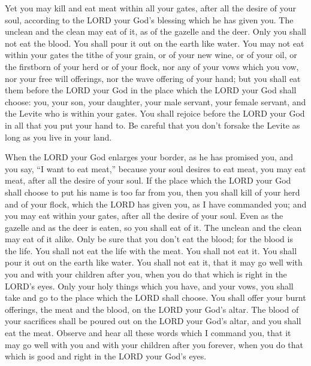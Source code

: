  Yet you may kill and eat meat within all your gates, after
all the desire of your soul, according to the LORD your God's blessing
which he has given you. The unclean and the clean may eat of it, as of
the gazelle and the deer.  Only you shall not eat the
blood. You shall pour it out on the earth like water.  You
may not eat within your gates the tithe of your grain, or of your new
wine, or of your oil, or the firstborn of your herd or of your flock,
nor any of your vows which you vow, nor your free will offerings, nor
the wave offering of your hand;  but you shall eat them
before the LORD your God in the place which the LORD your God shall
choose: you, your son, your daughter, your male servant, your female
servant, and the Levite who is within your gates. You shall rejoice
before the LORD your God in all that you put your hand to. 
Be careful that you don't forsake the Levite as long as you live in your
land.

 When the LORD your God enlarges your border, as he has
promised you, and you say, ``I want to eat meat,'' because your soul
desires to eat meat, you may eat meat, after all the desire of your
soul.  If the place which the LORD your God shall choose to
put his name is too far from you, then you shall kill of your herd and
of your flock, which the LORD has given you, as I have commanded you;
and you may eat within your gates, after all the desire of your soul.
 Even as the gazelle and as the deer is eaten, so you shall
eat of it. The unclean and the clean may eat of it alike. 
Only be sure that you don't eat the blood; for the blood is the life.
You shall not eat the life with the meat.  You shall not
eat it. You shall pour it out on the earth like water.  You
shall not eat it, that it may go well with you and with your children
after you, when you do that which is right in the LORD's eyes.
 Only your holy things which you have, and your vows, you
shall take and go to the place which the LORD shall choose.
 You shall offer your burnt offerings, the meat and the
blood, on the LORD your God's altar. The blood of your sacrifices shall
be poured out on the LORD your God's altar, and you shall eat the meat.
 Observe and hear all these words which I command you, that
it may go well with you and with your children after you forever, when
you do that which is good and right in the LORD your God's eyes.

